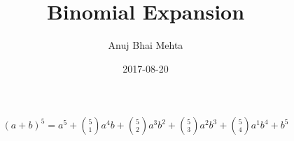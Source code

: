 \documentclass{article}
\title{Binomial Expansion}
\date{2017-08-20}
\author{Anuj Bhai Mehta}
\begin{document}
\maketitle



\begin{align*}
	{(a+b)}^5 = a^5 + \binom{5}{1} a^{4} b + \binom{5}{2} a^{3} b^2 + \binom{5}{3} a^{2} b^3 + \binom{5}{4} a^{1} b^4 + b^5
\end{align*}
\end{document}
